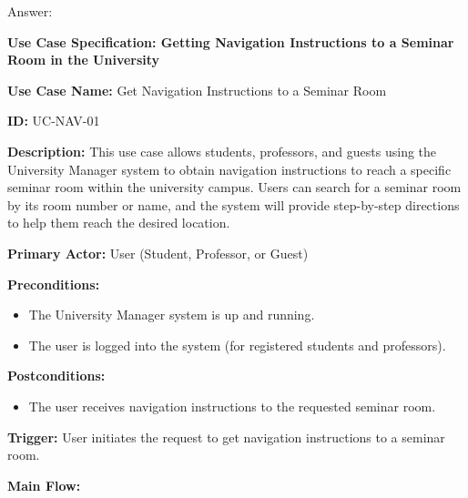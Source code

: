 \documentclass[conference,onecolumn]{IEEEtran}
\begin{document}
Answer:
\begin{framed}
	\small
	\textbf{Use Case Specification: Getting Navigation Instructions to a Seminar Room in the University}
	
	\textbf{Use Case Name:} Get Navigation Instructions to a Seminar Room
	
	\textbf{ID:} UC-NAV-01
	
	\textbf{Description:} This use case allows students, professors, and guests using the University Manager system to obtain navigation instructions to reach a specific seminar room within the university campus. Users can search for a seminar room by its room number or name, and the system will provide step-by-step directions to help them reach the desired location.
	
	\textbf{Primary Actor:} User (Student, Professor, or Guest)
	
	\textbf{Preconditions:}
	
	\begin{itemize}
		\item The University Manager system is up and running.
		\item The user is logged into the system (for registered students and professors).
	\end{itemize}
	
	\textbf{Postconditions:}
	
	\begin{itemize}
		\item The user receives navigation instructions to the requested seminar room.
	\end{itemize}
	
	\textbf{Trigger:} User initiates the request to get navigation instructions to a seminar room.
	
	\textbf{Main Flow:}
	

\end{framed}
\end{document}
